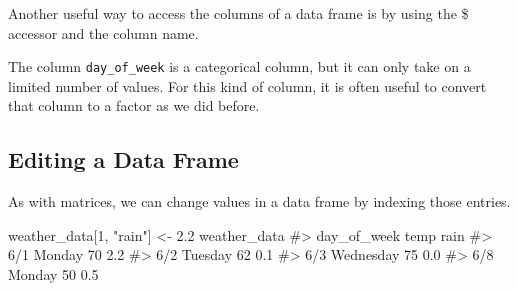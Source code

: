 \documentclass[
  letterpaper,
]{krantz}
\makeatletter
\newenvironment{Shaded}{\begin{snugshade}}{\end{snugshade}}
\newcommand{\CommentTok}[1]{\textcolor[rgb]{0.37,0.37,0.37}{#1}}
\newcommand{\DecValTok}[1]{\textcolor[rgb]{0.68,0.00,0.00}{#1}}
\newcommand{\FloatTok}[1]{\textcolor[rgb]{0.68,0.00,0.00}{#1}}
\newcommand{\FunctionTok}[1]{\textcolor[rgb]{0.28,0.35,0.67}{#1}}
\newcommand{\NormalTok}[1]{\textcolor[rgb]{0.00,0.23,0.31}{#1}}
\newcommand{\OtherTok}[1]{\textcolor[rgb]{0.00,0.23,0.31}{#1}}
\newcommand{\SpecialCharTok}[1]{\textcolor[rgb]{0.37,0.37,0.37}{#1}}
\newcommand{\StringTok}[1]{\textcolor[rgb]{0.13,0.47,0.30}{#1}}
\newenvironment{kframe}{%
\medskip{}
\setlength{\fboxsep}{.8em}
 \def\at@end@of@kframe{}%
 \ifinner\ifhmode%
  \def\at@end@of@kframe{\end{minipage}}%
  \begin{minipage}{\columnwidth}%
 \fi\fi%
 \def\FrameCommand##1{\hskip\@totalleftmargin \hskip-\fboxsep
 \colorbox{shadecolor}{##1}\hskip-\fboxsep
     \hskip-\linewidth \hskip-\@totalleftmargin \hskip\columnwidth}%
 \MakeFramed {\advance\hsize-\width
   \@totalleftmargin\z@ \linewidth\hsize
   \@setminipage}}%
 {\par\unskip\endMakeFramed%
 \at@end@of@kframe}
\renewenvironment{Shaded}{\begin{kframe}}{\end{kframe}}
\makeatother
\begin{document}
Another useful way to access the columns of a data frame is by using the
\$ accessor and the column name.

\begin{Shaded}
\end{Shaded}

The column \texttt{day\_of\_week} is a categorical column, but it can
only take on a limited number of values. For this kind of column, it is
often useful to convert that column to a factor as we did before.

\begin{Shaded}
\end{Shaded}

\subsection{Editing a Data Frame}\label{editing-a-data-frame}

As with matrices, we can change values in a data frame by indexing those
entries.

\begin{Shaded}
\begin{Highlighting}[]
\NormalTok{weather\_data[}\DecValTok{1}\NormalTok{, }\StringTok{"rain"}\NormalTok{] }\OtherTok{\textless{}{-}} \FloatTok{2.2}
\NormalTok{weather\_data}
\CommentTok{\#\textgreater{}     day\_of\_week temp rain}
\CommentTok{\#\textgreater{} 6/1      Monday   70  2.2}
\CommentTok{\#\textgreater{} 6/2     Tuesday   62  0.1}
\CommentTok{\#\textgreater{} 6/3   Wednesday   75  0.0}
\CommentTok{\#\textgreater{} 6/8      Monday   50  0.5}
\end{Highlighting}
\end{Shaded}
\end{document}
